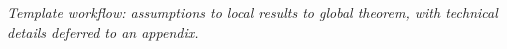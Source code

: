 \begin{center}
    

    \medskip
    \textit{Template workflow: assumptions to local results to global theorem, with technical details deferred to an appendix.}
\end{center}
